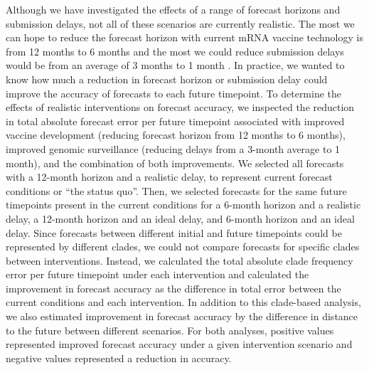 \documentclass[9pt,lineno]{elife}
\begin{document}
Although we have investigated the effects of a range of forecast horizons and submission delays, not all of these scenarios are currently realistic.
The most we can hope to reduce the forecast horizon with current mRNA vaccine technology is from 12 months to 6 months and the most we could reduce submission delays would be from an average of 3 months to 1 month \citep{Grant2023}.
In practice, we wanted to know how much a reduction in forecast horizon or submission delay could improve the accuracy of forecasts to each future timepoint.
To determine the effects of realistic interventions on forecast accuracy, we inspected the reduction in total absolute forecast error per future timepoint associated with improved vaccine development (reducing forecast horizon from 12 months to 6 months), improved genomic surveillance (reducing delays from a 3-month average to 1 month), and the combination of both improvements.
We selected all forecasts with a 12-month horizon and a realistic delay, to represent current forecast conditions or ``the status quo''.
Then, we selected forecasts for the same future timepoints present in the current conditions for a 6-month horizon and a realistic delay, a 12-month horizon and an ideal delay, and 6-month horizon and an ideal delay.
Since forecasts between different initial and future timepoints could be represented by different clades, we could not compare forecasts for specific clades between interventions.
Instead, we calculated the total absolute clade frequency error per future timepoint under each intervention and calculated the improvement in forecast accuracy as the difference in total error between the current conditions and each intervention.
In addition to this clade-based analysis, we also estimated improvement in forecast accuracy by the difference in distance to the future between different scenarios.
For both analyses, positive values represented improved forecast accuracy under a given intervention scenario and negative values represented a reduction in accuracy.
\end{document}
